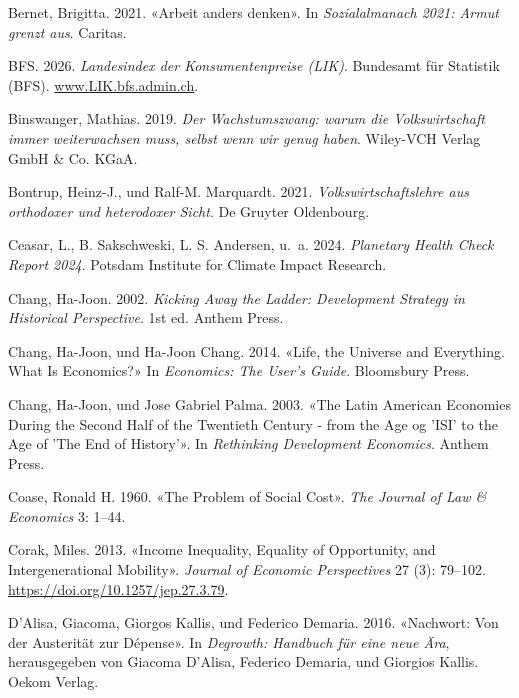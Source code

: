\documentclass[
  nswissgerman,
  a4paper,
  DIV=11,
  numbers=noendperiod,
  oneside,
  openany]{scrreprt}
\newlength{\cslhangindent}
\newenvironment{CSLReferences}[2] %
 {\begin{list}{}{%
  \setlength{\itemindent}{0pt}
  \setlength{\leftmargin}{0pt}
  \setlength{\parsep}{0pt}
  \ifodd #1
   \setlength{\leftmargin}{\cslhangindent}
   \setlength{\itemindent}{-1\cslhangindent}
  \fi
  \setlength{\itemsep}{#2\baselineskip}}}
 {\end{list}}
\begin{document}
\begin{CSLReferences}{1}{1}
Bernet, Brigitta. 2021. {«Arbeit anders denken»}. In
\emph{Sozialalmanach 2021: Armut grenzt aus}. Caritas.

BFS. 2026. \emph{Landesindex der {Konsumentenpreise} ({LIK})}. Bundesamt
für Statistik (BFS).
\href{https://www.LIK.bfs.admin.ch}{www.LIK.bfs.admin.ch}.

Binswanger, Mathias. 2019. \emph{Der Wachstumszwang: warum die
Volkswirtschaft immer weiterwachsen muss, selbst wenn wir genug haben}.
Wiley-VCH Verlag GmbH \& Co. KGaA.

Bontrup, Heinz-J., und Ralf-M. Marquardt. 2021.
\emph{Volkswirtschaftslehre aus orthodoxer und heterodoxer Sicht}. De
Gruyter Oldenbourg.

Ceasar, L., B. Sakschweski, L. S. Andersen, u.~a. 2024. \emph{Planetary
Health Check Report 2024}. Potsdam Institute for Climate Impact
Research.

Chang, Ha-Joon. 2002. \emph{Kicking Away the Ladder: Development
Strategy in Historical Perspective}. 1st ed. Anthem Press.

Chang, Ha-Joon, und Ha-Joon Chang. 2014. {«Life, the Universe and
Everything. What Is Economics?»} In \emph{Economics: The User's Guide}.
Bloomsbury Press.

Chang, Ha-Joon, und Jose Gabriel Palma. 2003. {«The Latin American
Economies During the Second Half of the Twentieth Century - from the Age
og 'ISI' to the Age of 'The End of History'»}. In \emph{Rethinking
Development Economics}. Anthem Press.

Coase, Ronald H. 1960. {«The Problem of Social Cost»}. \emph{The Journal
of Law \& Economics} 3: 1--44.

Corak, Miles. 2013. {«Income {Inequality}, {Equality} of {Opportunity},
and {Intergenerational Mobility}»}. \emph{Journal of Economic
Perspectives} 27 (3): 79--102.
\url{https://doi.org/10.1257/jep.27.3.79}.

D'Alisa, Giacoma, Giorgos Kallis, und Federico Demaria. 2016.
{«Nachwort: {Von} der {Austerität} zur {Dépense}»}. In \emph{Degrowth:
{Handbuch} für eine neue Ära}, herausgegeben von Giacoma D'Alisa,
Federico Demaria, und Giorgios Kallis. Oekom Verlag.


\end{CSLReferences}
\end{document}
